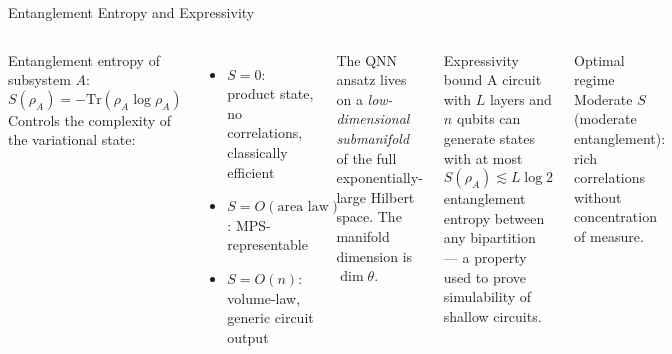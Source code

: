 \documentclass[aspectratio=169,10pt]{beamer}
\begin{document}
\begin{frame}{Entanglement Entropy and Expressivity}
  \begin{columns}[T]
      Entanglement entropy of subsystem $A$:
      \[
        S(\rho_A) = -\mathrm{Tr}(\rho_A\log\rho_A)
      \]
      Controls the complexity of the variational state:
      \begin{itemize}
        \item $S=0$: product state, no correlations, classically
              efficient
        \item $S = O(\text{area law})$: MPS-representable
        \item $S = O(n)$: volume-law, generic circuit output
      \end{itemize}

      \medskip
      The QNN ansatz lives on a \emph{low-dimensional submanifold}
      of the full exponentially-large Hilbert space.
      The manifold dimension is $\dim\theta$.
      \begin{alertblock}{Expressivity bound}
        A circuit with $L$ layers and $n$ qubits can generate states
        with at most
        \[
          S(\rho_A) \lesssim L\log 2
        \]
        entanglement entropy between any bipartition — a property
        used to prove simulability of shallow circuits.
      \end{alertblock}
      \vspace{0.2cm}
      \begin{block}{Optimal regime}
        Moderate $S$ (moderate entanglement): rich correlations
        without concentration of measure.
      \end{block}
  \end{columns}
\end{frame}
\end{document}

